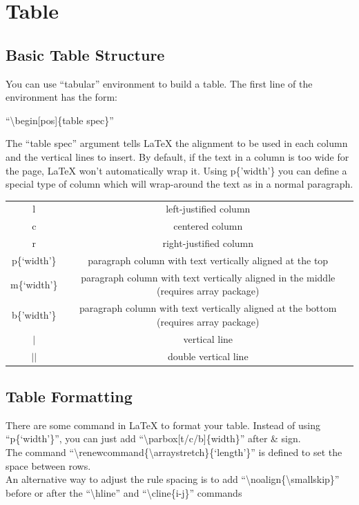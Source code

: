 \documentclass[10pt,a4paper,fleqn]{article}
\def\bslash{\textbackslash} %
\begin{document}
\section{Table}
\subsection{Basic Table Structure}
You can use ``tabular'' environment to build a table. The first line of the environment has the form: \begin{center}``\bslash begin[pos]\{table spec\}'' \end{center} The ``table spec'' argument tells LaTeX the alignment to be used in each column and the vertical lines to insert. By default, if the text in a column is too wide for the page, LaTeX won’t automatically wrap it. Using p\{'width'\} you can define a special type of column which will wrap-around the text as in a normal paragraph.

\begin{tabular}{|c|c|}
\hline
l & left-justified column\\
c & centered column\\
r & right-justified column\\
p\{`width'\} & paragraph column with text vertically aligned at the top\\
m\{`width'\} & paragraph column with text vertically aligned in the middle (requires array package)\\
b\{'width'\} & paragraph column with text vertically aligned at the bottom (requires array package)\\
$|$ & vertical line\\
$||$ & double vertical line\\
\hline
\end{tabular}

\subsection{Table Formatting}
There are some command in LaTeX to format your table. Instead of using ``p\{`width'\}'', you can just add ``\bslash parbox[t/c/b]\{width\}'' after \& sign.\\
The command ``\bslash renewcommand\{\bslash arraystretch\}\{`length'\}'' is defined to set the space between rows.\\
An alternative way to adjust the rule spacing is to add ``\bslash noalign\{\bslash smallskip\}'' before or after the ``\bslash hline'' and ``\bslash cline\{i-j\}'' commands 
 
\end{document}
